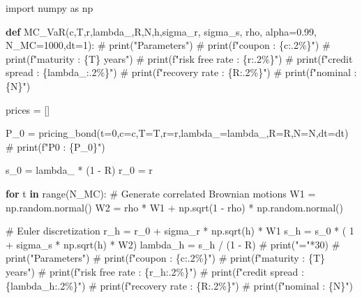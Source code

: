 \documentclass[
  letterpaper,
  DIV=11,
  numbers=noendperiod]{scrartcl}
\newenvironment{Shaded}{\begin{snugshade}}{\end{snugshade}}
\newcommand{\BuiltInTok}[1]{\textcolor[rgb]{0.00,0.23,0.31}{#1}}
\newcommand{\CommentTok}[1]{\textcolor[rgb]{0.37,0.37,0.37}{#1}}
\newcommand{\ControlFlowTok}[1]{\textcolor[rgb]{0.00,0.23,0.31}{\textbf{#1}}}
\newcommand{\DecValTok}[1]{\textcolor[rgb]{0.68,0.00,0.00}{#1}}
\newcommand{\FloatTok}[1]{\textcolor[rgb]{0.68,0.00,0.00}{#1}}
\newcommand{\ImportTok}[1]{\textcolor[rgb]{0.00,0.46,0.62}{#1}}
\newcommand{\KeywordTok}[1]{\textcolor[rgb]{0.00,0.23,0.31}{\textbf{#1}}}
\newcommand{\NormalTok}[1]{\textcolor[rgb]{0.00,0.23,0.31}{#1}}
\newcommand{\OperatorTok}[1]{\textcolor[rgb]{0.37,0.37,0.37}{#1}}
\begin{document}
\begin{Shaded}
\begin{Highlighting}[]
\ImportTok{import}\NormalTok{ numpy }\ImportTok{as}\NormalTok{ np}

\KeywordTok{def}\NormalTok{ MC\_VaR(c,T,r,lambda\_,R,N,h,sigma\_r, sigma\_s, rho, alpha}\OperatorTok{=}\FloatTok{0.99}\NormalTok{, N\_MC}\OperatorTok{=}\DecValTok{1000}\NormalTok{,dt}\OperatorTok{=}\DecValTok{1}\NormalTok{):}
    \CommentTok{\# print("Parameters")}
    \CommentTok{\# print(f"coupon : \{c:.2\%\}")}
    \CommentTok{\# print(f"maturity : \{T\} years")}
    \CommentTok{\# print(f"risk free rate : \{r:.2\%\}")}
    \CommentTok{\# print(f"credit spread : \{lambda\_:.2\%\}")}
    \CommentTok{\# print(f"recovery rate : \{R:.2\%\}")}
    \CommentTok{\# print(f"nominal : \{N\}")}

\NormalTok{    prices }\OperatorTok{=}\NormalTok{ []}
    
\NormalTok{    P\_0 }\OperatorTok{=}\NormalTok{ pricing\_bond(t}\OperatorTok{=}\DecValTok{0}\NormalTok{,c}\OperatorTok{=}\NormalTok{c,T}\OperatorTok{=}\NormalTok{T,r}\OperatorTok{=}\NormalTok{r,lambda\_}\OperatorTok{=}\NormalTok{lambda\_,R}\OperatorTok{=}\NormalTok{R,N}\OperatorTok{=}\NormalTok{N,dt}\OperatorTok{=}\NormalTok{dt)}
    \CommentTok{\# print(f"P0 : \{P\_0\}")}

\NormalTok{    s\_0 }\OperatorTok{=}\NormalTok{ lambda\_ }\OperatorTok{*}\NormalTok{ (}\DecValTok{1} \OperatorTok{{-}}\NormalTok{ R)}
\NormalTok{    r\_0 }\OperatorTok{=}\NormalTok{ r}

    \ControlFlowTok{for}\NormalTok{ t }\KeywordTok{in} \BuiltInTok{range}\NormalTok{(N\_MC):}
        \CommentTok{\# Generate correlated Brownian motions}
\NormalTok{        W1 }\OperatorTok{=}\NormalTok{ np.random.normal()}
\NormalTok{        W2 }\OperatorTok{=}\NormalTok{ rho }\OperatorTok{*}\NormalTok{ W1 }\OperatorTok{+}\NormalTok{ np.sqrt(}\DecValTok{1} \OperatorTok{{-}}\NormalTok{ rho) }\OperatorTok{*}\NormalTok{ np.random.normal()}

        \CommentTok{\# Euler discretization }
\NormalTok{        r\_h }\OperatorTok{=}\NormalTok{ r\_0 }\OperatorTok{+}\NormalTok{ sigma\_r }\OperatorTok{*}\NormalTok{ np.sqrt(h) }\OperatorTok{*}\NormalTok{ W1}
\NormalTok{        s\_h }\OperatorTok{=}\NormalTok{ s\_0 }\OperatorTok{*}\NormalTok{ ( }\DecValTok{1} \OperatorTok{+}\NormalTok{ sigma\_s }\OperatorTok{*}\NormalTok{ np.sqrt(h) }\OperatorTok{*}\NormalTok{ W2)}
\NormalTok{        lambda\_h }\OperatorTok{=}\NormalTok{ s\_h }\OperatorTok{/}\NormalTok{ (}\DecValTok{1} \OperatorTok{{-}}\NormalTok{ R)}
        \CommentTok{\# print("="*30)}
        \CommentTok{\# print("Parameters")}
        \CommentTok{\# print(f"coupon : \{c:.2\%\}")}
        \CommentTok{\# print(f"maturity : \{T\} years")}
        \CommentTok{\# print(f"risk free rate : \{r\_h:.2\%\}")}
        \CommentTok{\# print(f"credit spread : \{lambda\_h:.2\%\}")}
        \CommentTok{\# print(f"recovery rate : \{R:.2\%\}")}
        \CommentTok{\# print(f"nominal : \{N\}")}


\end{Highlighting}
\end{Shaded}
\end{document}

